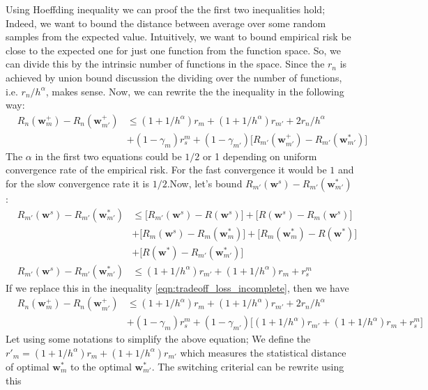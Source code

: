 \documentclass[11pt, a4paper, reqno, twoside]{scrartcl}
\theoremstyle{style}
\newcommand{\wv}{\bm{w}}
\newcommand{\0}{\mathbf{0}} %
\begin{document}
Using Hoeffding inequality we can proof the the first two inequalities hold;
Indeed, we want to bound the distance between average over some random samples from the
expected value. Intuitively, we want to bound empirical risk be close to the
expected one for just one function from the function space. So, we can divide
this by the intrinsic number of functions in the space. Since the $r_n$ is
achieved by union bound discussion the dividing over the number of functions, i.e. $r_n/h^\alpha$, makes sense.
Now, we can rewrite the the inequality in the following way:
\begin{eqnarray}
	& R_n(\wv^+_m) - R_n(\wv^+_{m'}) & \leq (1+1/h^\alpha)r_m + (1+1/h^\alpha)
	r_{m'} + 2 r_n/h^\alpha \nonumber \\
	& & + (1-\gamma_m)r_s^m + (1-\gamma_{m'})
	\bigg[R_{m'}(\wv^+_{m'}) - R_{m'}(\wv^*_{m'}) \bigg]
	\label{eqn:tradeoff_loss_incomplete}
\end{eqnarray}
The $\alpha$ in the first two equations could be $1/2$ or 1 depending on uniform
convergence rate of the empirical risk. For the fast convergence it would be $1$
and for the slow convergence rate it is $1/2$.Now, let's bound $R_{m'}(\wv^s) - R_{m'}(\wv^*_{m'})$ : 
\begin{eqnarray}
	& R_{m'}(\wv^s) - R_{m'}(\wv^*_{m'}) & \leq \bigg[ R_{m'}(\wv^s) -
	R(\wv^s)\bigg] + \bigg[ R(\wv^s) - R_m(\wv^s) \bigg] \nonumber\\ 
	& & + \bigg[ R_m(\wv^s) - R_m(\wv^*_m)\bigg] + \bigg[R_m(\wv^*_m) -
	R(\wv^*)\bigg] \nonumber\\ 
	& & + \bigg[ R(\wv^*) - R_{m'}(\wv_{m'}^*)\bigg] \nonumber\\ 
	& R_{m'}(\wv^s) - R_{m'}(\wv^*_{m'}) & \leq (1+1/h^\alpha)r_{m'} +
	(1+1/h^\alpha)r_m + r_s^m \label{eqn:initial_suboptimality}
\end{eqnarray}
If we replace this in the inequality \ref{eqn:tradeoff_loss_incomplete}, then we
have 
\begin{eqnarray*}
	& R_n(\wv^+_m) - R_n(\wv^+_{m'}) & \leq (1+1/h^\alpha)r_m + (1+1/h^\alpha)
	r_{m'} + 2 r_n/h^\alpha \nonumber \\
	& & + (1-\gamma_m)r_s^m + (1-\gamma_{m'})
	\bigg[ (1+1/h^\alpha)r_{m'} +
	(1+1/h^\alpha)r_m + r_s^m \bigg]
\end{eqnarray*}	
Let using some notations to simplify the above equation; We define the $r'_m = (1+1/h^\alpha)r_m + (1+1/h^\alpha)
	r_{m'}$ which measures the statistical distance of optimal $\wv^*_m$ to
	the optimal $\wv^*_{m'}$. The switching criterial can be rewrite using this
\end{document}
